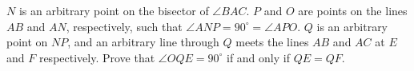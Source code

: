 $N$ is an arbitrary point on the bisector of $\angle BAC$. $P$ and $O$ are points on the lines $AB$ and $AN$, respectively, such that $\angle ANP = 90^\circ = \angle APO$. $Q$ is an arbitrary point on $NP$, and an arbitrary line through $Q$ meets the lines $AB$ and $AC$ at $E$ and $F$ respectively. Prove that $\angle OQE = 90^\circ$ if and only if $QE = QF$.
